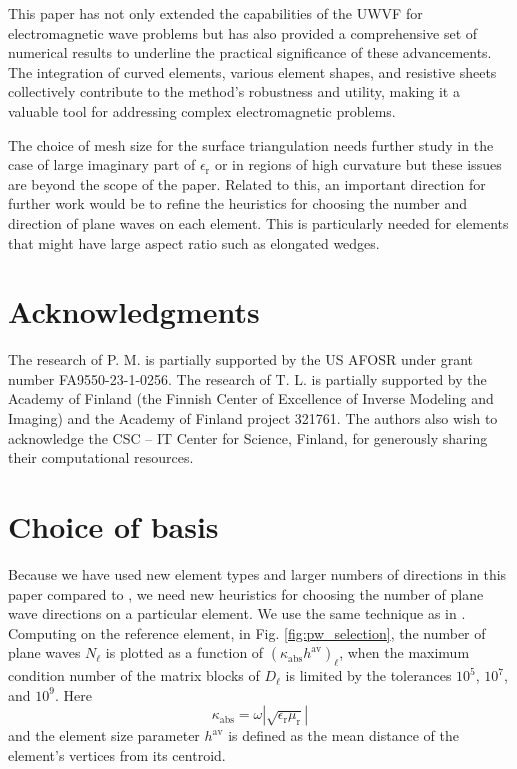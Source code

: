 \documentclass[a4paper,12pt]{article}
\newcommand{\epsr}{\epsilon_{\mathrm{r}}}
\newcommand{\mur}{\mu_{\mathrm{r}}}
\begin{document}
This paper has not only extended the capabilities of the UWVF for electromagnetic wave problems but has also provided a comprehensive set of numerical results to underline the practical significance of these advancements. The integration of curved elements, various element shapes, and resistive sheets collectively contribute to the method's robustness and utility, making it a valuable tool for addressing complex electromagnetic problems.

The choice of mesh size for the surface triangulation needs further study in the case of large imaginary part of $\epsr$ or in regions of high curvature but these issues are beyond the scope of the paper. Related to this, an important direction for further work would be to refine the 
heuristics for choosing the number and direction of plane waves on
each element. This is particularly needed for elements that might have
large aspect ratio such as elongated wedges.

\section*{Acknowledgments}

The research of P. M. is partially supported by the US AFOSR under grant number FA9550-23-1-0256.  The research of T. L. is partially supported by the Academy of Finland (the Finnish Center of Excellence of Inverse Modeling and Imaging) and the Academy of Finland project 321761. The authors also wish to acknowledge the CSC – IT Center for Science, Finland, for generously sharing their computational resources.

\appendices
\section{Choice of basis}\label{sec:app}

Because we have used new element types and larger numbers of directions in this paper compared to \cite{Huttunen2007}, we need new heuristics for choosing the number of plane wave directions on a particular element.  We use the same technique as in \cite{Huttunen2007}. Computing on the reference element, in Fig. \ref{fig:pw_selection}, the number of plane waves $N_{\ell}$ is plotted as a function of $(\kappa_{\mathrm{abs}}h^{\mathrm{av}})_{\ell}$, when the maximum condition number of the matrix blocks of $D_{\ell}$ is limited by the tolerances $10^5$, $10^7$, and $10^9$.
Here
\begin{displaymath}
    \kappa_{\mathrm{abs}} = \omega\left|\sqrt{\epsr \mur}\right| 
\end{displaymath}
and the  element size parameter $h^{\mathrm{av}}$ is defined as the mean distance of the element's vertices from its centroid. 
\end{document}
